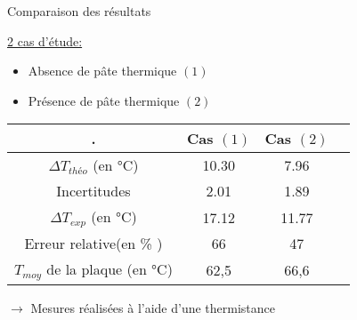 \documentclass[hyperref={pdfpagelabels=false}]{beamer}
\begin{document}
%
%
%
%



\begin{frame}{Comparaison des résultats {\textcolor{ultramarine}{\hyperlink{a3}{}}} }

\underline{2 cas d’étude:} 
\begin{itemize}
\item Absence de pâte thermique $(1)$
\item Présence de pâte thermique $(2)$
\end{itemize}

\begin{center}
\begin{tabular}{ | c |  c |  c | c | }
 \hline
 {\color{white}.}& Cas $(1)$ & Cas $(2)$ \\
 \hline
 $\Delta T_{théo}$ (en °C) & 10.30 &  7.96 \\
  \hline
  Incertitudes & 2.01 & 1.89 \\
   \hline
 $\Delta T_{exp}$ (en °C) & 17.12 & 11.77  \\
 \hline
 Erreur relative(en \% ) & 66 & 47 \\
\hline
 $T_{moy}$ de la plaque (en °C) & 62,5 & 66,6 \\
 
 \hline
\end{tabular} \par
\end{center}

$\rightarrow$ Mesures réalisées à l'aide d'une thermistance 
\end{frame}
\end{document}
